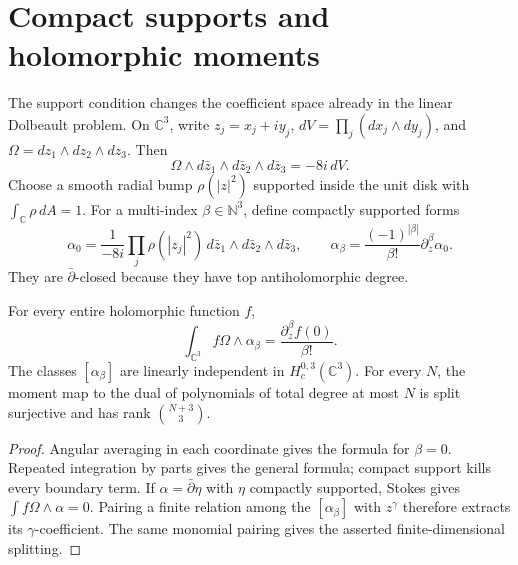 \section{Compact supports and holomorphic moments}
\label{cyquant:sec:moments}

The support condition changes the coefficient space already in the
linear Dolbeault problem.  On $\mathbb C^3$, write
$z_j=x_j+iy_j$, $dV=\prod_j(dx_j\wedge dy_j)$, and
$\Omega=dz_1\wedge dz_2\wedge dz_3$.  Then
\[
 \Omega\wedge d\bar z_1\wedge d\bar z_2\wedge d\bar z_3=-8i\,dV.
\]
Choose a smooth radial bump $\rho(|z|^2)$ supported inside the unit disk
with $\int_{\mathbb C}\rho\,dA=1$.  For a multi-index
$\beta\in\mathbb N^3$, define compactly supported forms
\begin{equation}\label{cyquant:eq:moment-forms}
 \alpha_0=\frac1{-8i}\prod_j\rho(|z_j|^2)\,
               d\bar z_1\wedge d\bar z_2\wedge d\bar z_3,
 \qquad
 \alpha_\beta=\frac{(-1)^{|\beta|}}{\beta!}
                         \partial_z^\beta\alpha_0.
\end{equation}
They are $\bar\partial$-closed because they have top antiholomorphic
degree.

\begin{proposition}\label{cyquant:prop:moments}
For every entire holomorphic function $f$,
\[
 \int_{\mathbb C^3}f\Omega\wedge\alpha_\beta
       =\frac{\partial_z^\beta f(0)}{\beta!}.
\]
The classes $[\alpha_\beta]$ are linearly independent in
$H_c^{0,3}(\mathbb C^3)$.  For every $N$, the moment map to the dual of
polynomials of total degree at most $N$ is split surjective and has rank
$\binom{N+3}{3}$.
\end{proposition}

\begin{proof}
Angular averaging in each coordinate gives the formula for $\beta=0$.
Repeated integration by parts gives the general formula; compact support
kills every boundary term.  If $\alpha=\bar\partial\eta$ with $\eta$
compactly supported, Stokes gives $\int f\Omega\wedge\alpha=0$.
Pairing a finite relation among the $[\alpha_\beta]$ with $z^\gamma$
therefore extracts its $\gamma$-coefficient.  The same monomial pairing
gives the asserted finite-dimensional splitting.
\end{proof}

